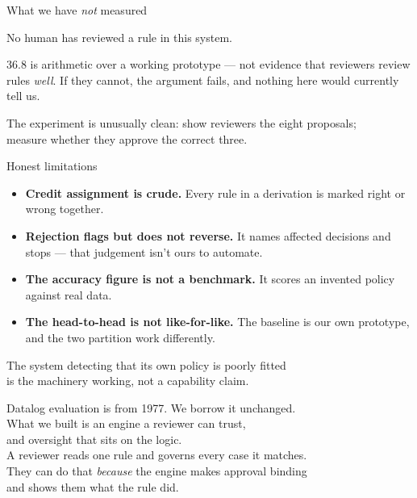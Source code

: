 \documentclass[aspectratio=169,11pt]{beamer}
\begin{document}
\begin{frame}{What we have \emph{not} measured}
  \vspace{1.5em}
  \begin{center}
    {\large\color{amber} No human has reviewed a rule in this system.}
  \end{center}
  \vspace{1.3em}
  36.8 is arithmetic over a working prototype --- not evidence that reviewers
  review rules \emph{well}. If they cannot, the argument fails, and nothing here
  would currently tell us.
  \vspace{1.3em}
  \pause
  \begin{center}\color{pinedark}
    The experiment is unusually clean: show reviewers the eight proposals;\\
    measure whether they approve the correct three.
  \end{center}
\end{frame}

\begin{frame}{Honest limitations}
  \vspace{.9em}
  \begin{itemize}
    \setlength\itemsep{.85em}
    \item \textbf{Credit assignment is crude.} Every rule in a derivation is
      marked right or wrong together.
    \item \textbf{Rejection flags but does not reverse.} It names affected
      decisions and stops --- that judgement isn't ours to automate.
    \item \textbf{The accuracy figure is not a benchmark.} It scores an invented
      policy against real data.
    \item \textbf{The head-to-head is not like-for-like.} The baseline is our
      own prototype, and the two partition work differently.
  \end{itemize}
  \vspace{1.3em}
  \begin{center}\color{muted}
    The system detecting that its own policy is poorly fitted\\
    is the machinery working, not a capability claim.
  \end{center}
\end{frame}

{
\begin{frame}[plain]
  \vfill
  \begin{center}
    {\large Datalog evaluation is from 1977. We borrow it unchanged.}\\[1.4em]
    {\fontsize{21}{25}\selectfont\color{pinedark}What we built is an engine a
    reviewer can trust,\\ and oversight that sits on the logic.}\\[1.6em]
    {\color{ink}A reviewer reads one rule and governs every case it matches.\\
    They can do that \emph{because} the engine makes approval binding\\
    and shows them what the rule did.}
  \end{center}
  \vfill
\end{frame}}
\end{document}
